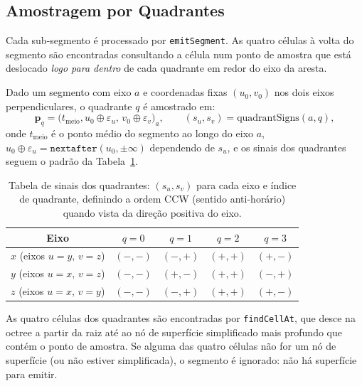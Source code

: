 \documentclass[10pt,a4paper]{article}
\begin{document}
\subsection{Amostragem por Quadrantes}
\label{sec:itriangles:quadrants}

Cada sub-segmento é processado por \lstinline{emitSegment}. As quatro
células à volta do segmento são encontradas consultando a célula num
ponto de amostra que está deslocado \emph{logo para dentro} de cada
quadrante em redor do eixo da aresta.

Dado um segmento com eixo $a$ e coordenadas fixas $(u_0, v_0)$ nos
dois eixos perpendiculares, o quadrante $q$ é amostrado em:
\[
  \mathbf{p}_q = \bigl(t_{\text{meio}}, u_0 \oplus \varepsilon_u,\,
  v_0 \oplus \varepsilon_v\bigr)_a,
  \qquad (s_u, s_v) = \text{quadrantSigns}(a, q),
\]
onde $t_{\text{meio}}$ é o ponto médio do segmento ao longo do eixo
$a$, $u_0 \oplus \varepsilon_u = \texttt{nextafter}(u_0,\pm\infty)$
dependendo de $s_u$, e os sinais dos quadrantes seguem o padrão da
Tabela~\ref{tab:quad_signs}.

\begin{table}[htb]
\centering
\caption{Tabela de sinais dos quadrantes: $(s_u, s_v)$ para cada eixo
e índice de quadrante, definindo a ordem CCW (sentido anti-horário)
quando vista da direção positiva do eixo.}
\label{tab:quad_signs}
\begin{tabular}{c|cccc}
\toprule
Eixo & $q=0$ & $q=1$ & $q=2$ & $q=3$ \\
\midrule
$x$ (eixos $u{=}y,\, v{=}z$) & $(-,-)$ & $(-,+)$ & $(+,+)$ & $(+,-)$\\
$y$ (eixos $u{=}x,\, v{=}z$) & $(-,-)$ & $(+,-)$ & $(+,+)$ & $(-,+)$\\
$z$ (eixos $u{=}x,\, v{=}y$) & $(-,-)$ & $(-,+)$ & $(+,+)$ & $(+,-)$\\
\bottomrule
\end{tabular}
\end{table}

As quatro células dos quadrantes são encontradas por
\lstinline{findCellAt}, que desce na octree a partir da raiz até ao
nó de superfície simplificado mais profundo que contém o ponto de
amostra. Se alguma das quatro células não for um nó de superfície
(ou não estiver simplificada), o segmento é ignorado: não há
superfície para emitir.
\end{document}
